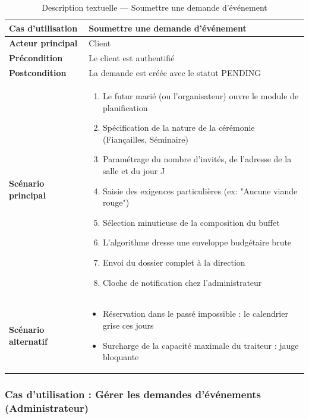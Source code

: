 \begin{table}[H]
    \centering
    \caption{Description textuelle --- Soumettre une demande d'événement}
    \label{tab:desc_demande_event}
    \renewcommand{\arraystretch}{1.3}
    \begin{tabular}{|p{4cm}|p{8.5cm}|}
        \hline
        \textbf{Cas d'utilisation} & Soumettre une demande d'événement \\
        \hline
        \textbf{Acteur principal} & Client \\
        \hline
        \textbf{Précondition} & Le client est authentifié \\
        \hline
        \textbf{Postcondition} & La demande est créée avec le statut PENDING \\
        \hline
        \textbf{Scénario principal} &
        \begin{enumerate}
            \item Le futur marié (ou l'organisateur) ouvre le module de planification
            \item Spécification de la nature de la cérémonie (Fiançailles, Séminaire)
            \item Paramétrage du nombre d'invités, de l'adresse de la salle et du jour J
            \item Saisie des exigences particulières (ex: "Aucune viande rouge")
            \item Sélection minutieuse de la composition du buffet
            \item L'algorithme dresse une enveloppe budgétaire brute
            \item Envoi du dossier complet à la direction
            \item Cloche de notification chez l'administrateur
        \end{enumerate} \\
        \hline
        \textbf{Scénario alternatif} &
        \begin{itemize}
            \item[3a.] Réservation dans le passé impossible : le calendrier grise ces jours
            \item[3b.] Surcharge de la capacité maximale du traiteur : jauge bloquante
        \end{itemize} \\
        \hline
    \end{tabular}
\end{table}

\subsubsection{Cas d'utilisation : Gérer les demandes d'événements (Administrateur)}

